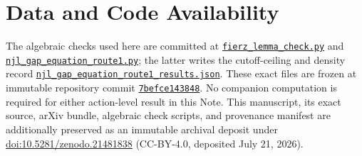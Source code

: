 \documentclass[aps,prd,twocolumn,superscriptaddress,preprintnumbers,nofootinbib,longbibliography,floatfix]{revtex4-2}
\newcommand{\artifactpinned}[2]{\href{https://github.com/Hubify-Projects/bigbounce/blob/7befce143848b925998a3e6ecc850aa510ab3a94/#1}{\nolinkurl{#2}}}
\begin{document}
\section*{Data and Code Availability}

The algebraic checks used here are committed at
\artifactpinned{arxiv/scripts/fierz_lemma_check.py}{fierz_lemma_check.py} and
\artifactpinned{arxiv/scripts/njl_gap_equation_route1.py}{njl_gap_equation_route1.py}; the latter writes the
cutoff-ceiling and density record
\artifactpinned{arxiv/scripts/njl_gap_equation_route1_results.json}{njl_gap_equation_route1_results.json}.  These exact files are frozen at immutable
repository commit
\href{https://github.com/Hubify-Projects/bigbounce/tree/7befce143848b925998a3e6ecc850aa510ab3a94}{\texttt{7befce143848}}.
No companion computation is
required for either action-level result in this Note.
This manuscript, its exact source, arXiv bundle, algebraic check scripts, and
provenance manifest are additionally preserved as an immutable archival deposit
under \href{https://doi.org/10.5281/zenodo.21481838}{doi:10.5281/zenodo.21481838}
(CC-BY-4.0, deposited July 21, 2026).

\appendix
\end{document}
